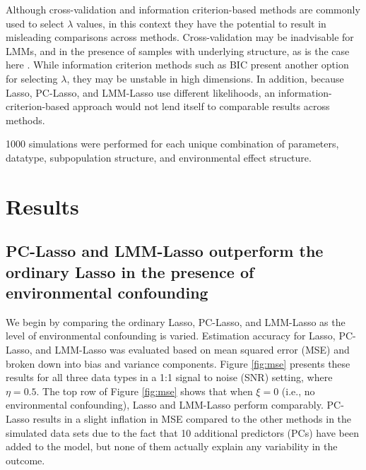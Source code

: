 Although cross-validation and information criterion-based methods are commonly used to select $\lambda$ values, in this context they have the potential to result in misleading comparisons across methods. Cross-validation may be inadvisable for LMMs, and in the presence of samples with underlying structure, as is the case here \citep{roberts2017cross}. While information criterion methods such as BIC present another option for selecting $\lambda$, they may be unstable in high dimensions. In addition, because Lasso, PC-Lasso, and LMM-Lasso use different likelihoods, an information-criterion-based approach would not lend itself to comparable results across methods. 

1000 simulations were performed for each unique combination of parameters, datatype, subpopulation structure, and environmental effect structure. 


\section{Results} \label{sec:results}

\subsection{PC-Lasso and LMM-Lasso outperform the ordinary Lasso in the presence of environmental confounding}

We begin by comparing the ordinary Lasso, PC-Lasso, and LMM-Lasso as the level of environmental confounding is varied. Estimation accuracy for Lasso, PC-Lasso, and LMM-Lasso was evaluated based on mean squared error (MSE) and broken down into bias and variance components. Figure \ref{fig:mse} presents these results for all three data types in a 1:1 signal to noise (SNR) setting, where $\eta = 0.5$. The top row of Figure \ref{fig:mse} shows that when $\xi = 0$ (i.e., no environmental confounding), Lasso and LMM-Lasso perform comparably. PC-Lasso results in a slight inflation in MSE compared to the other methods in the simulated data sets due to the fact that 10 additional predictors (PCs) have been added to the model, but none of them actually explain any variability in the outcome. 

